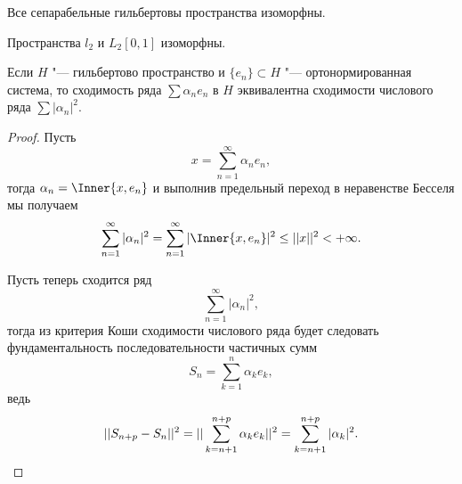 \documentclass[main]{subfiles}
\begin{document}
\begin{theorem*}
  Все сепарабельные гильбертовы пространства изоморфны.
\end{theorem*}

\begin{theorem*}
  Пространства \( l_2 \) и \( L_2[0, 1] \) изоморфны.
\end{theorem*}

\begin{theorem*}
  Если \( H \) "--- гильбертово пространство и
  \( \{ e_n \} \subset H  \) "---
  ортонормированная система,
  то сходимость ряда \( \sum \alpha_n e_n \) в \( H \)
  эквивалентна сходимости числового ряда \( \sum |\alpha_n|^2 \).
\end{theorem*}
\begin{proof}
  Пусть
  \[ x = \sum_{n = 1}^\infty \alpha_n e_n, \]
  тогда \( \alpha_n = \Inner{x, e_n} \) и выполнив
  предельный переход в неравенстве Бесселя мы
  получаем
  \[
    \sum_{n = 1}^\infty |\alpha_n|^2 =
    \sum_{n = 1}^\infty |\Inner{x, e_n}|^2 \le
    ||x||^2 < +\infty.
  \]

  Пусть теперь сходится ряд
  \[
    \sum_{n=1}^\infty |\alpha_n|^2,
  \]
  тогда из критерия Коши сходимости числового ряда
  будет следовать фундаментальность
  последовательности частичных сумм
  \[
    S_n = \sum_{k=1}^n \alpha_k e_k,
  \]
  ведь
  \[
    ||S_{n + p} - S_{n}||^2 =
    ||\sum_{k=n+1}^{n+p} \alpha_k e_k||^2 =
    \sum_{k=n+1}^{n+p} |\alpha_k|^2. \qedhere
  \]
\end{proof}
\end{document}
